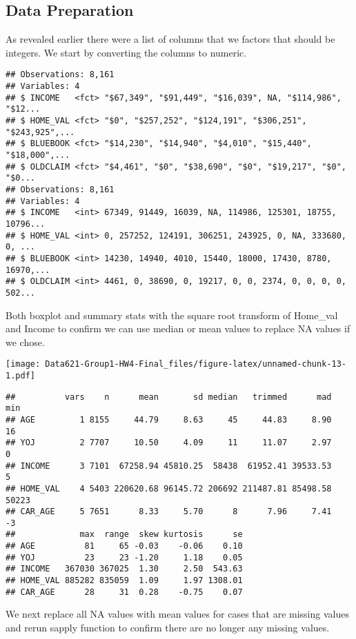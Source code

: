 \documentclass[]{article}
\begin{document}
\hypertarget{data-preparation}{%
\subsection{Data Preparation}\label{data-preparation}}

As revealed earlier there were a list of columns that we factors that
should be integers. We start by converting the columns to numeric.

\begin{verbatim}
## Observations: 8,161
## Variables: 4
## $ INCOME   <fct> "$67,349", "$91,449", "$16,039", NA, "$114,986", "$12...
## $ HOME_VAL <fct> "$0", "$257,252", "$124,191", "$306,251", "$243,925",...
## $ BLUEBOOK <fct> "$14,230", "$14,940", "$4,010", "$15,440", "$18,000",...
## $ OLDCLAIM <fct> "$4,461", "$0", "$38,690", "$0", "$19,217", "$0", "$0...
## Observations: 8,161
## Variables: 4
## $ INCOME   <int> 67349, 91449, 16039, NA, 114986, 125301, 18755, 10796...
## $ HOME_VAL <int> 0, 257252, 124191, 306251, 243925, 0, NA, 333680, 0, ...
## $ BLUEBOOK <int> 14230, 14940, 4010, 15440, 18000, 17430, 8780, 16970,...
## $ OLDCLAIM <int> 4461, 0, 38690, 0, 19217, 0, 0, 2374, 0, 0, 0, 0, 502...
\end{verbatim}

Both boxplot and summary stats with the square root transform of
Home\_val and Income to confirm we can use median or mean values to
replace NA values if we chose.

\texttt{[image: Data621-Group1-HW4-Final\_files/figure-latex/unnamed-chunk-13-1.pdf]}

\begin{verbatim}
##          vars    n      mean       sd median   trimmed      mad   min
## AGE         1 8155     44.79     8.63     45     44.83     8.90    16
## YOJ         2 7707     10.50     4.09     11     11.07     2.97     0
## INCOME      3 7101  67258.94 45810.25  58438  61952.41 39533.53     5
## HOME_VAL    4 5403 220620.68 96145.72 206692 211487.81 85498.58 50223
## CAR_AGE     5 7651      8.33     5.70      8      7.96     7.41    -3
##             max  range  skew kurtosis      se
## AGE          81     65 -0.03    -0.06    0.10
## YOJ          23     23 -1.20     1.18    0.05
## INCOME   367030 367025  1.30     2.50  543.63
## HOME_VAL 885282 835059  1.09     1.97 1308.01
## CAR_AGE      28     31  0.28    -0.75    0.07
\end{verbatim}

We next replace all NA values with mean values for cases that are
missing values and rerun sapply function to confirm there are no longer
any missing values.
\end{document}
